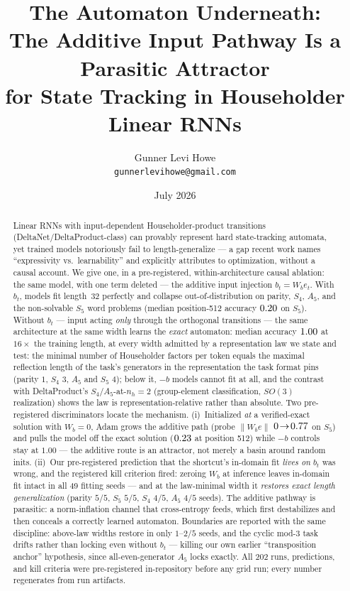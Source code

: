 \documentclass[10pt]{article}
\title{The Automaton Underneath:\\ The Additive Input Pathway Is a Parasitic Attractor\\
for State Tracking in Householder Linear RNNs}
\author{Gunner Levi Howe\\\texttt{gunnerlevihowe@gmail.com}}
\date{July 2026}
\newcommand{\bt}{b_t}
\begin{document}
\maketitle

\begin{abstract}
Linear RNNs with input-dependent Householder-product transitions (DeltaNet/DeltaProduct-class) can
provably represent hard state-tracking automata, yet trained models notoriously fail to
length-generalize --- a gap recent work names ``expressivity vs.\ learnability'' and explicitly
attributes to optimization, without a causal account. We give one, in a pre-registered,
within-architecture causal ablation: the same model, with one term deleted --- the additive input
injection $\bt = W_b e_t$. With $\bt$, models fit length~32 perfectly and collapse out-of-distribution
on parity, $S_4$, $A_5$, and the non-solvable $S_5$ word problems (median position-512 accuracy
$0.20$ on $S_5$). Without $\bt$ --- input acting \emph{only} through the
orthogonal transitions --- the same architecture at the same width learns the \emph{exact} automaton:
median accuracy $1.00$ at $16\times$ the training length, at every width admitted
by a representation law we state and test: the minimal number of Householder factors per token equals
the maximal reflection length of the task's generators in the representation the task format pins
(parity $1$, $S_4$ $3$, $A_5$ and $S_5$ $4$); below it, $-b$ models cannot fit at all, and the
contrast with DeltaProduct's $S_4/A_5$-at-$n_h{=}2$ (group-element classification, $SO(3)$
realization) shows the law is representation-relative rather than absolute. Two pre-registered
discriminators locate the mechanism. (i)~Initialized \emph{at} a verified-exact solution with
$W_b{=}0$, Adam grows the additive path (probe $\lVert W_b e\rVert$ $0\!\to\!0.77$
on $S_5$) and pulls the model off the exact solution ($0.23$ at position 512)
while $-b$ controls stay at $1.00$ --- the additive route is an attractor, not merely a basin around
random inits. (ii)~Our pre-registered prediction that the shortcut's in-domain fit \emph{lives on}
$\bt$ was wrong, and the registered kill criterion fired: zeroing $W_b$ at inference leaves in-domain
fit intact in all 49 fitting seeds --- and at the law-minimal width it \emph{restores exact length
generalization} (parity $5/5$, $S_5$ $5/5$, $S_4$ $4/5$, $A_5$ $4/5$ seeds). The additive pathway is
parasitic: a norm-inflation channel that cross-entropy feeds, which first destabilizes and then
conceals a correctly learned automaton. Boundaries are reported with the same discipline: above-law
widths restore in only $1$--$2/5$ seeds, and the cyclic mod-3 task drifts rather than locking even
without $\bt$ --- killing our own earlier ``transposition anchor'' hypothesis, since all-even-generator
$A_5$ locks exactly. All 202 runs, predictions, and kill criteria were pre-registered in-repository
before any grid run; every number regenerates from run artifacts.
\end{abstract}
\end{document}
